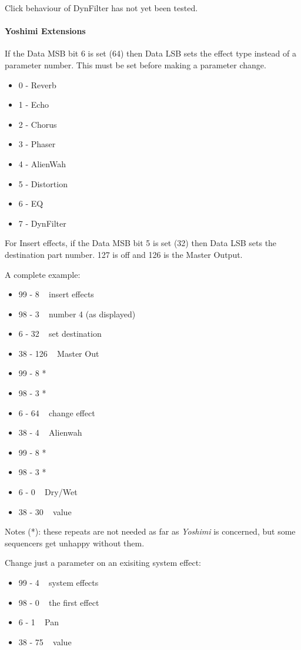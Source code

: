    Click behaviour of DynFilter has not yet been tested.

\paragraph{Yoshimi Extensions}

   If the Data MSB bit 6 is set (64) then Data LSB sets the effect type
   instead of a parameter number.  This must be set before making a parameter
   change.

   \begin{itemize}
      \item 0 - Reverb
      \item 1 - Echo
      \item 2 - Chorus
      \item 3 - Phaser
      \item 4 - AlienWah
      \item 5 - Distortion
      \item 6 - EQ
      \item 7 - DynFilter
   \end{itemize}

   For Insert effects, if the Data MSB bit 5 is set (32) then Data LSB sets
   the destination part number. 127 is off and 126 is the Master Output.

   A complete example:

   \begin{itemize}
      \item 99 -   8 ~ insert effects
      \item 98 -   3 ~ number 4 (as displayed)
      \item 6 -  32 ~ set destination
      \item 38 - 126 ~ Master Out
      \item 99 -   8  *
      \item 98 -   3  *
      \item 6 -  64 ~ change effect
      \item 38 -   4 ~ Alienwah
      \item 99 -   8  *
      \item 98 -   3  *
      \item 6 -   0 ~ Dry/Wet
      \item 38 -  30 ~ value
   \end{itemize}

   Notes (*): these repeats are not needed as far as \textsl{Yoshimi}
   is concerned, but some sequencers get unhappy without them.

   Change just a parameter on an exisiting system effect:

   \begin{itemize}
      \item 99 -   4 ~ system effects
      \item 98 -   0 ~ the first effect
      \item 6 -   1 ~ Pan
      \item 38 -  75 ~ value
   \end{itemize}

